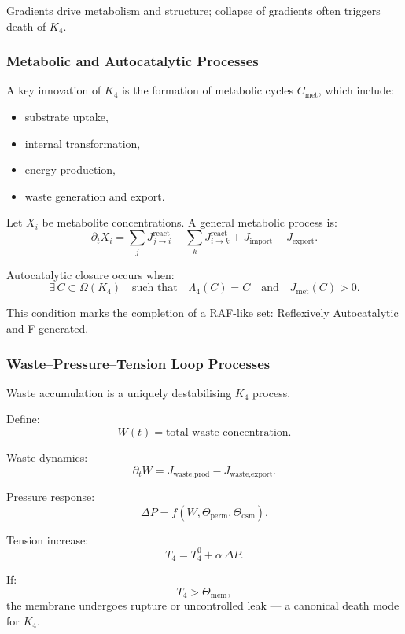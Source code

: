 Gradients drive metabolism and structure; collapse of gradients often
triggers death of $K_4$.

\subsubsection{Metabolic and Autocatalytic Processes}

A key innovation of $K_4$ is the formation of metabolic cycles
$C_\text{met}$, which include:
\begin{itemize}
    \item substrate uptake,
    \item internal transformation,
    \item energy production,
    \item waste generation and export.
\end{itemize}

Let $X_i$ be metabolite concentrations.
A general metabolic process is:
\[
\partial_t X_i =
\sum_j J_{j \to i}^{\text{react}}
    - \sum_k J_{i \to k}^{\text{react}}
    + J_{\text{import}} - J_{\text{export}}.
\]

Autocatalytic closure occurs when:
\[
\exists\, C \subset \Omega(K_4)
\quad\text{such that}\quad
\Lambda_4(C) = C \quad\text{and}\quad J_{\text{met}}(C) > 0.
\]

This condition marks the completion of a RAF-like set:
Reflexively Autocatalytic and F-generated.

\subsubsection{Waste–Pressure–Tension Loop Processes}

Waste accumulation is a uniquely destabilising $K_4$ process.

Define:
\[
W(t) = \text{total waste concentration}.
\]

Waste dynamics:
\[
\partial_t W = J_{\text{waste,prod}} - J_{\text{waste,export}}.
\]

Pressure response:
\[
\Delta P = f(W, \Theta_{\text{perm}}, \Theta_{\text{osm}}).
\]

Tension increase:
\[
T_4 = T_4^0 + \alpha\, \Delta P.
\]

If:
\[
T_4 > \Theta_{\text{mem}},
\]
the membrane undergoes rupture or uncontrolled leak — a canonical death
mode for $K_4$.

